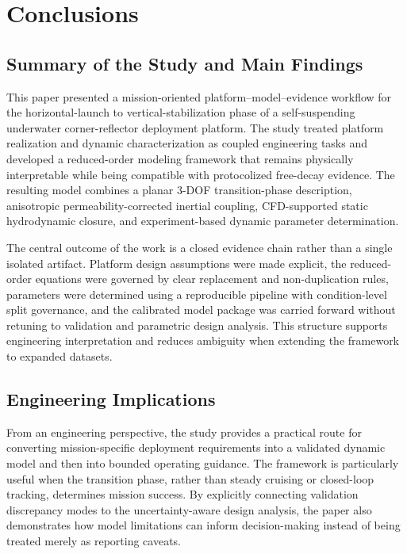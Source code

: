 \section{Conclusions}

\subsection{Summary of the Study and Main Findings}

This paper presented a mission-oriented platform--model--evidence workflow for the horizontal-launch to vertical-stabilization phase of a self-suspending underwater corner-reflector deployment platform. The study treated platform realization and dynamic characterization as coupled engineering tasks and developed a reduced-order modeling framework that remains physically interpretable while being compatible with protocolized free-decay evidence. The resulting model combines a planar 3-DOF transition-phase description, anisotropic permeability-corrected inertial coupling, CFD-supported static hydrodynamic closure, and experiment-based dynamic parameter determination.

The central outcome of the work is a closed evidence chain rather than a single isolated artifact. Platform design assumptions were made explicit, the reduced-order equations were governed by clear replacement and non-duplication rules, parameters were determined using a reproducible pipeline with condition-level split governance, and the calibrated model package was carried forward without retuning to validation and parametric design analysis. This structure supports engineering interpretation and reduces ambiguity when extending the framework to expanded datasets.

\subsection{Engineering Implications}

From an engineering perspective, the study provides a practical route for converting mission-specific deployment requirements into a validated dynamic model and then into bounded operating guidance. The framework is particularly useful when the transition phase, rather than steady cruising or closed-loop tracking, determines mission success. By explicitly connecting validation discrepancy modes to the uncertainty-aware design analysis, the paper also demonstrates how model limitations can inform decision-making instead of being treated merely as reporting caveats.

